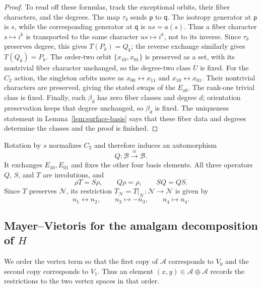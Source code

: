 \documentclass[11pt]{amsart}
\theoremstyle{remark}
\numberwithin{equation}{section}
\begin{document}
\begin{proof}
To read off these formulas, track the exceptional orbits, their fiber
characters, and the degrees. The map $\tau_\delta$ sends $\mathsf p$
to $\mathsf q$. The isotropy generator at $\mathsf p$ is $s$, while
the corresponding generator at $\mathsf q$ is $us=a(s)$. Thus a fiber
character $s\mapsto i^k$ is transported to the same character
$us\mapsto i^k$, not to its inverse. Since $\tau_\delta$ preserves
degree, this gives $T(P_k)=Q_k$; the reverse exchange similarly gives
$T(Q_k)=P_k$. The order-two orbit $\{x_{10},x_{01}\}$ is preserved as
a set, with its nontrivial fiber character unchanged, so the degree-two
class $U$ is fixed. For the $C_2$ action, the singleton orbits move as
$x_{00}\leftrightarrow x_{11}$ and $x_{10}\leftrightarrow x_{01}$.
Their nontrivial characters are preserved, giving the stated swaps of
the $E_{ab}$. The rank-one trivial class is fixed. Finally, each
$\beta_d$ has zero fiber classes and degree $d$; orientation
preservation keeps that degree unchanged, so $\beta_d$ is fixed. The
uniqueness statement in Lemma~\ref{lem:surface-basis} says that these
fiber data and degrees determine the classes and the proof is finished.
\end{proof}

Rotation by $s$ normalizes $C_2$ and therefore induces an
automorphism
\[
 Q\colon\mathcal B\xrightarrow{\cong}\mathcal B.
\]
It exchanges $E_{10},E_{01}$ and fixes the other four basis
elements. All three operators $Q$, $S$, and $T$ are involutions,
and
\begin{equation*}
 \rho T=S\rho,\qquad Q\rho=\rho,\qquad SQ=QS.
\end{equation*}
Since $T$ preserves $\mathcal N$, its restriction
$T_{\mathcal N}=T|_{\mathcal N}\colon\mathcal N\to\mathcal N$ is given
by
\begin{equation}\label{eq:kernel-action}
 n_1\leftrightarrow n_2,
 \qquad n_3\longmapsto-n_3,\qquad n_4\longmapsto n_4.
\end{equation}


\subsection{Mayer--Vietoris for the amalgam decomposition of
\texorpdfstring{$H$}{H}}

We order the vertex term so that the first copy of $\mathcal A$
corresponds to $V_0$ and the second copy corresponds to $V_1$.
Thus an element $(x,y)\in\mathcal A\oplus\mathcal A$ records the
restrictions to the two vertex spaces in that order.
\end{document}
